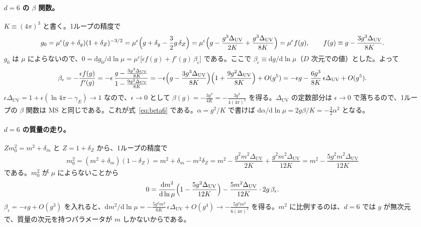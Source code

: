 \documentclass[a4paper,10pt]{ltjsarticle}
\newcommand{\dd}{\mathrm{d}}
\begin{document}
\paragraph{$d=6$ の $\beta$ 関数。}$K\equiv(4\pi)^3$ と書く。1ループの精度で
\begin{equation*}
g_0=\mu^\epsilon(g+\delta_g)(1+\delta_Z)^{-3/2}=\mu^\epsilon\Bigl(g+\delta_g-\frac32g\,\delta_Z\Bigr)
=\mu^\epsilon\Bigl(g-\frac{g^3\Delta_{\mathrm{UV}}}{2K}+\frac{g^3\Delta_{\mathrm{UV}}}{8K}\Bigr)=\mu^\epsilon f(g),\qquad f(g)\equiv g-\frac{3g^3\Delta_{\mathrm{UV}}}{8K}.
\end{equation*}
$g_0$ は $\mu$ によらないので、$0=\dd g_0/\dd\ln\mu=\mu^\epsilon\bigl[\epsilon f(g)+f'(g)\,\beta_\epsilon\bigr]$ である。ここで $\beta_\epsilon\equiv\dd g/\dd\ln\mu$（$D$ 次元での値）とした。よって
\begin{equation*}
\beta_\epsilon=-\frac{\epsilon f(g)}{f'(g)}=-\epsilon\,\frac{g-\frac{3g^3\Delta_{\mathrm{UV}}}{8K}}{1-\frac{9g^2\Delta_{\mathrm{UV}}}{8K}}
=-\epsilon\Bigl(g-\frac{3g^3\Delta_{\mathrm{UV}}}{8K}\Bigr)\Bigl(1+\frac{9g^2\Delta_{\mathrm{UV}}}{8K}\Bigr)+O(g^5)
=-\epsilon g-\frac{6g^3}{8K}\,\epsilon\Delta_{\mathrm{UV}}+O(g^5).
\end{equation*}
$\epsilon\Delta_{\mathrm{UV}}=1+\epsilon(\ln4\pi-\gamma_E)\to1$ なので、$\epsilon\to0$ として $\beta(g)=-\frac{3g^3}{4K}=-\frac{3g^3}{4(4\pi)^3}$ を得る。$\Delta_{\mathrm{UV}}$ の定数部分は $\epsilon\to0$ で落ちるので、1ループの $\beta$ 関数は MS と同じである。これが式~\eqref{eq:beta6} である。$\alpha=g^2/K$ で書けば $\dd\alpha/\dd\ln\mu=2g\beta/K=-\frac32\alpha^2$ となる。

\paragraph{$d=6$ の質量の走り。}$Zm_0^2=m^2+\delta_m$ と $Z=1+\delta_Z$ から、1ループの精度で
\begin{equation*}
m_0^2=(m^2+\delta_m)(1-\delta_Z)=m^2+\delta_m-m^2\delta_Z=m^2-\frac{g^2m^2\Delta_{\mathrm{UV}}}{2K}+\frac{g^2m^2\Delta_{\mathrm{UV}}}{12K}=m^2-\frac{5g^2m^2\Delta_{\mathrm{UV}}}{12K}
\end{equation*}
である。$m_0^2$ が $\mu$ によらないことから
\begin{equation*}
0=\frac{\dd m^2}{\dd\ln\mu}\Bigl(1-\frac{5g^2\Delta_{\mathrm{UV}}}{12K}\Bigr)-\frac{5m^2\Delta_{\mathrm{UV}}}{12K}\cdot2g\,\beta_\epsilon .
\end{equation*}
$\beta_\epsilon=-\epsilon g+O(g^3)$ を入れると、$\dd m^2/\dd\ln\mu=-\frac{5g^2m^2}{6K}\,\epsilon\Delta_{\mathrm{UV}}+O(g^4)\to-\frac{5g^2m^2}{6(4\pi)^3}$ を得る。$m^2$ に比例するのは、$d=6$ では $g$ が無次元で、質量の次元を持つパラメータが $m$ しかないからである。
\end{document}
